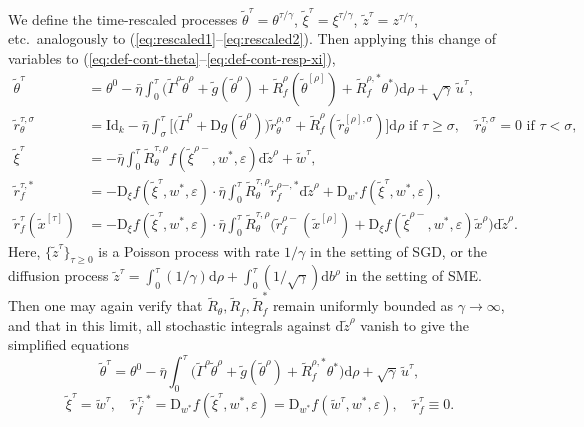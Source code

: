 \documentclass[11pt,letterpaper,reqno]{amsart}
\theoremstyle{definition}
\def\eps{\varepsilon}
\def\d{\mathrm{d}}
\def\D{\mathrm{D}}
\def\Id{\mathrm{Id}}
\begin{document}
We define the time-rescaled processes $\tilde\theta^\tau=\theta^{\tau/\gamma}$,
$\tilde \xi^\tau=\xi^{\tau/\gamma}$, $\tilde z^\tau=z^{\tau/\gamma}$,
etc.\ analogously to
(\ref{eq:rescaled1}--\ref{eq:rescaled2}). Then applying this change of variables
to (\ref{eq:def-cont-theta}--\ref{eq:def-cont-resp-xi}),
\begin{align*}
\tilde\theta^{\tau}&=\theta^0 - \bar\eta \int_0^{\tau} \Big(\tilde\Gamma^\rho
\tilde\theta^\rho+\tilde g(\tilde\theta^\rho)+\tilde R_f^\rho(\tilde\theta^{[\rho]})+\tilde R_f^{\rho,*}\theta^*\Big)\d \rho+\sqrt{\gamma}\,\tilde
u^{\tau},\\
\tilde r_\theta^{\tau,\sigma}&=\Id_k-\bar\eta\int_\sigma^\tau
\Big[\Big(\tilde\Gamma^\rho+\D g(\tilde \theta^\rho)\Big)
\tilde r_\theta^{\rho,\sigma}+\tilde R_f^\rho(\tilde
r_\theta^{[\rho],\sigma})\Big]\d \rho \text{ if } \tau \geq \sigma,
\quad \tilde r_\theta^{\tau,\sigma}=0 \text{ if }
\tau<\sigma,\\
\tilde\xi^\tau&={-}\bar\eta
\int_0^\tau \tilde R_\theta^{\tau,\rho}
f(\tilde\xi^{\rho-},w^*,\eps)\d \tilde z^\rho+\tilde w^\tau,\\
\tilde r_f^{\tau,*}&={-}\D_\xi f(\tilde \xi^\tau,w^*,\eps)
\cdot \bar\eta
\int_0^\tau \tilde R_\theta^{\tau,\rho}\tilde r_f^{\rho-,*}\d \tilde z^\rho
+\D_{w^*} f(\tilde \xi^\tau,w^*,\eps),\\
\tilde r_f^\tau(\tilde x^{[\tau]})
&={-}\D_\xi f(\tilde \xi^\tau,w^*,\eps)
\cdot \bar\eta \int_0^\tau \tilde R_\theta^{\tau,\rho}
\Big(\tilde r_f^{\rho-}(\tilde x^{[\rho]})
+\D_\xi f(\tilde \xi^{\rho-},w^*,\eps)\tilde x^\rho\Big)\d \tilde z^\rho.
\end{align*}
Here, $\{\tilde z^\tau\}_{\tau \geq 0}$ is a Poisson process with rate
$1/\gamma$ in the setting of SGD, or the diffusion process $\tilde
z^\tau=\int_0^\tau (1/\gamma)\d \rho+\int_0^\tau (1/\sqrt{\gamma})\d b^\rho$
in the setting of SME. Then one may again verify that $\tilde
R_\theta,\tilde R_f,\tilde R_f^*$ remain uniformly bounded as $\gamma \to
\infty$, and that in this limit, all stochastic integrals against $\d \tilde
z^\rho$ vanish to give the simplified equations
\begin{equation}\label{eq:theta-timeres-1}
\tilde\theta^\tau=\theta^0-\bar\eta \int_0^\tau \Big(\tilde \Gamma^\rho
\tilde\theta^\rho+\tilde g(\tilde \theta^\rho)+ \tilde
R_f^{\rho,*}\theta^*\Big)\d \rho+\sqrt{\gamma}\,\tilde u^\tau,
\end{equation}
\[\tilde \xi^\tau=\tilde w^\tau,
\quad \tilde r_f^{\tau,*}=\D_{w^*} f(\tilde \xi^\tau,w^*,\eps)
=\D_{w^*} f(\tilde w^\tau,w^*,\eps),
\quad \tilde r_f^\tau \equiv 0.\]
\end{document}

